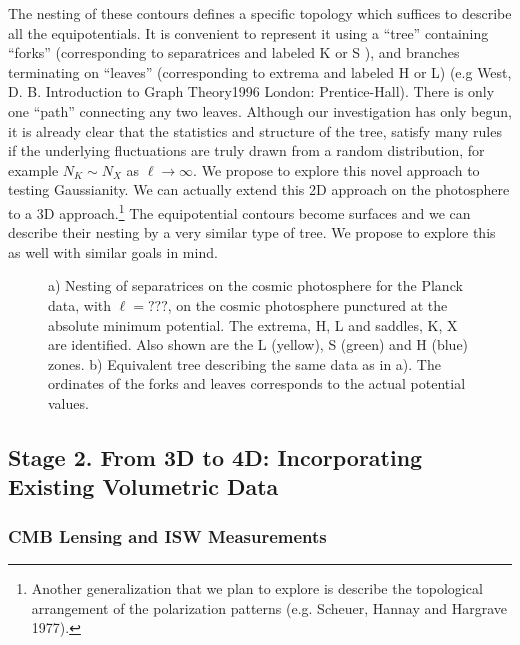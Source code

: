 \documentclass[psfig,11pt]{article}
\begin{document}
The nesting of these contours defines a specific topology which suffices to describe all the equipotentials. It is convenient to represent it using a ``tree'' containing ``forks'' (corresponding to separatrices and labeled K or S ), and branches terminating on ``leaves'' (corresponding to extrema and labeled H or L) (e.g West, D. B. Introduction to Graph Theory1996 London: Prentice-Hall). There is only one ``path'' connecting any two leaves. Although our investigation has only begun, it is already clear that the statistics and structure of the tree, satisfy many rules if the underlying fluctuations are truly drawn from a random distribution, for example $N_K\sim N_X$ as $\ell\rightarrow\infty$. We propose to explore this novel approach to testing Gaussianity. We can actually extend this 2D approach on the photosphere to a 3D approach.\footnote{Another generalization that we plan to explore is describe the topological arrangement of the polarization patterns (e.g. Scheuer, Hannay and Hargrave 1977).} The equipotential contours become surfaces and we can describe their nesting by a very similar type of tree. We propose to explore this as well with similar goals in mind.
\begin{figure}[t]
\centering
\caption{a) Nesting of separatrices on the cosmic photosphere for the Planck data, with $\ell=???$, on the cosmic photosphere punctured at the absolute minimum potential. The extrema, H, L and saddles, K, X are identified. Also shown are the L (yellow), S (green) and H (blue) zones. b) Equivalent tree describing the same data as in a). The ordinates of the forks and leaves corresponds to the actual potential values.}
\end{figure}


\subsection{Stage 2. From 3D to 4D: Incorporating Existing Volumetric Data}

\subsubsection{CMB Lensing and ISW Measurements}
\end{document}
